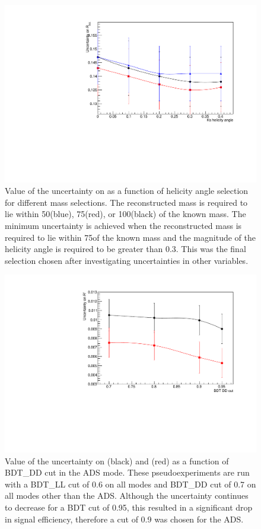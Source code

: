 \begin{figure}
\centering
\includegraphics[width=0.8\linewidth]{figures/selection/optimisation.pdf}
\caption{Value of the uncertainty on \Rkk as a function of \KS helicity angle selection for different \Kstar mass selections. The reconstructed \Kstarm mass is required to lie within 50\mevcc (blue), 75\mevcc (red), or 100\mevcc (black) of the known \Kstar mass. The minimum uncertainty is achieved when the reconstructed \Kstar mass is required to lie within 75\mevcc of the known \Kstar mass and the magnitude of the \KS helicity angle is required to be greater than 0.3. This was the final \Kstar selection chosen after investigating uncertainties in other variables.}
\label{optimisation}
\end{figure}

\begin{figure}
\centering
\includegraphics[width=0.8\linewidth]{figures/selection/ADSoptimisation.pdf}
\caption{Value of the uncertainty on \Rptwo (black) and \Rmtwo (red) as a function of BDT\_DD cut in the ADS mode. These pseudoexperiments are run with a BDT\_LL cut of 0.6 on all modes and BDT\_DD cut of 0.7 on all modes other than the ADS. Although the uncertainty continues to decrease for a BDT cut of 0.95, this resulted in a significant drop in signal efficiency, therefore a cut of 0.9 was chosen for the ADS.}
\label{adsoptimisation}
\end{figure}

